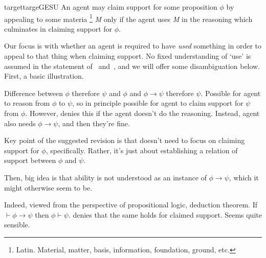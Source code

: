 \begin{note}[Focus]
  \begin{restatable}[\gESU{}]{target}{targeGESU}\label{denied-claim}
    An agent may claim support for some proposition \(\phi\) by appealing to some materia\nolinebreak
    \footnote{Latin.
      Material, matter, basis, information, foundation, ground, etc.
    }
    \emph{M} only if the agent uses \emph{M} in the reasoning which culminates in claiming support for \(\phi\).
  \end{restatable}
  Our focus is with whether an agent is required to have \emph{used} something in order to appeal to that thing when claiming support.
  No fixed understanding of `use' is assumed in the statement of~\ESU{} and~\gESU{}, and we will offer some disambiguation below.
  First, a basic illustration.
\end{note}

\begin{note}[Simplest]
  \color{red}
  Difference between \(\phi\) therefore \(\psi\) and \(\phi\) and \(\phi \rightarrow \psi\) therefore \(\psi\).
  Possible for agent to reason from \(\phi\) to \(\psi\), so in principle possible for agent to claim support for \(\psi\) from \(\phi\).
  However, \ESU{} denies this if the agent doesn't do the reasoning.
  Instead, agent also needs \(\phi \rightarrow \psi\), and then they're fine.

  Key point of the suggested revision is that \ESU{} doesn't need to focus on claiming support for \(\phi\), specifically.
  Rather, it's just about establishing a relation of support between \(\phi\) and \(\psi\).

  Then, big idea is that ability is not understood as an instance of \(\phi \rightarrow \psi\), which it might otherwise seem to be.

  Indeed, viewed from the perspective of propositional logic, deduction theorem.
  If \(\vdash \phi \rightarrow \psi\) then \(\phi \vdash \psi\).
  \ESU{} denies that the same holds for claimed support.
  Seems quite sensible.
\end{note}

